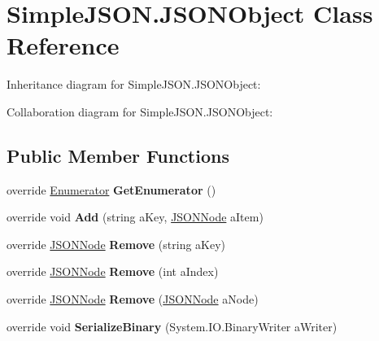 \hypertarget{classSimpleJSON_1_1JSONObject}{}\section{Simple\+J\+S\+O\+N.\+J\+S\+O\+N\+Object Class Reference}
\label{classSimpleJSON_1_1JSONObject}


Inheritance diagram for Simple\+J\+S\+O\+N.\+J\+S\+O\+N\+Object\+:


Collaboration diagram for Simple\+J\+S\+O\+N.\+J\+S\+O\+N\+Object\+:
\subsection*{Public Member Functions}
\begin{DoxyCompactItemize}
\item 
override \hyperlink{structSimpleJSON_1_1JSONNode_1_1Enumerator}{Enumerator} {\bfseries Get\+Enumerator} ()\hypertarget{classSimpleJSON_1_1JSONObject_a7c98dae8c5126df0c1d2ab51140f7faa}{}\label{classSimpleJSON_1_1JSONObject_a7c98dae8c5126df0c1d2ab51140f7faa}

\item 
override void {\bfseries Add} (string a\+Key, \hyperlink{classSimpleJSON_1_1JSONNode}{J\+S\+O\+N\+Node} a\+Item)\hypertarget{classSimpleJSON_1_1JSONObject_adb6e416049b90dc558c6c358d44437ae}{}\label{classSimpleJSON_1_1JSONObject_adb6e416049b90dc558c6c358d44437ae}

\item 
override \hyperlink{classSimpleJSON_1_1JSONNode}{J\+S\+O\+N\+Node} {\bfseries Remove} (string a\+Key)\hypertarget{classSimpleJSON_1_1JSONObject_a4c282478102eff961df08212da11a8b9}{}\label{classSimpleJSON_1_1JSONObject_a4c282478102eff961df08212da11a8b9}

\item 
override \hyperlink{classSimpleJSON_1_1JSONNode}{J\+S\+O\+N\+Node} {\bfseries Remove} (int a\+Index)\hypertarget{classSimpleJSON_1_1JSONObject_a4d1b339bf85e82baf2a143559ff5689a}{}\label{classSimpleJSON_1_1JSONObject_a4d1b339bf85e82baf2a143559ff5689a}

\item 
override \hyperlink{classSimpleJSON_1_1JSONNode}{J\+S\+O\+N\+Node} {\bfseries Remove} (\hyperlink{classSimpleJSON_1_1JSONNode}{J\+S\+O\+N\+Node} a\+Node)\hypertarget{classSimpleJSON_1_1JSONObject_a5fefce72acdb086a4859046ed0e38b06}{}\label{classSimpleJSON_1_1JSONObject_a5fefce72acdb086a4859046ed0e38b06}

\item 
override void {\bfseries Serialize\+Binary} (System.\+I\+O.\+Binary\+Writer a\+Writer)\hypertarget{classSimpleJSON_1_1JSONObject_a498de84fb87958eaee2a9ef27a785849}{}\label{classSimpleJSON_1_1JSONObject_a498de84fb87958eaee2a9ef27a785849}

\end{DoxyCompactItemize}
